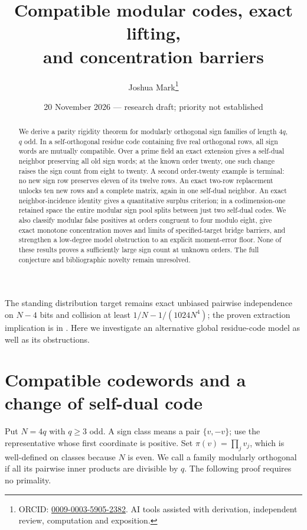 \documentclass[11pt]{article}
\title{Compatible modular codes, exact lifting,\\and concentration barriers}
\author{Joshua Mark\thanks{ORCID: \href{https://orcid.org/0009-0003-5905-2382}{0009-0003-5905-2382}. AI tools assisted with derivation, independent review, computation and exposition.}}
\date{20 November 2026 --- research draft; priority not established}
\begin{document}
\maketitle

\begin{abstract}
We derive a parity rigidity theorem for modularly orthogonal sign
families of length $4q$, $q$ odd. In a self-orthogonal residue code
containing five real orthogonal rows, all sign words are mutually
compatible. Over a prime field an exact extension gives a self-dual
neighbor preserving all old sign words; at the known order twenty,
one such change raises the sign count from eight to twenty.
A second order-twenty example is terminal: no new sign row preserves
eleven of its twelve rows. An exact two-row replacement unlocks ten
new rows and a complete matrix, again in one self-dual neighbor.
An exact neighbor-incidence identity gives a quantitative surplus
criterion; in a codimension-one retained space the entire modular
sign pool splits between just two self-dual codes.
We also classify modular false positives at orders congruent to four
modulo eight, give exact monotone concentration moves and limits of
specified-target bridge barriers, and strengthen a low-degree model
obstruction to an explicit moment-error floor.
None of these results proves a sufficiently large sign count at
unknown orders. The full conjecture and bibliographic novelty remain
unresolved.
\end{abstract}
The standing distribution target remains exact unbiased pairwise
independence on $N-4$ bits and collision at least
$1/N-1/(1024N^4)$; the proven extraction implication is in
. Here we investigate an
alternative global residue-code model as well as its obstructions.
\section{Compatible codewords and a change of self-dual code}
\label{sec:compatible-codes}

Put $N=4q$ with $q\ge3$ odd. A sign class means a pair $\{v,-v\}$;
use the representative whose first coordinate is positive. Set
$\pi(v)=\prod_jv_j$, which is well-defined on classes because $N$ is even.
We call a family modularly orthogonal if all its pairwise inner products
are divisible by $q$. The following proof requires no primality.
\end{document}
